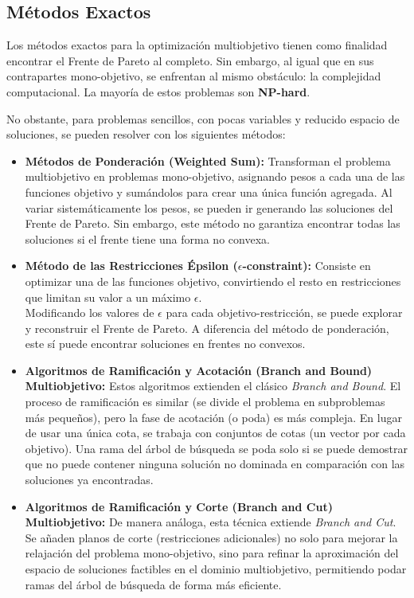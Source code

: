 \documentclass[12pt,a4paper]{book}
\begin{document}
\hrulefill

\subsection{Métodos Exactos}

Los métodos exactos para la optimización multiobjetivo tienen como finalidad encontrar el Frente de Pareto al completo. Sin embargo, al igual que en sus contrapartes mono-objetivo, se enfrentan al mismo obstáculo: la complejidad computacional. La mayoría de estos problemas son \textbf{NP-hard}.

No obstante, para problemas sencillos, con pocas variables y reducido espacio de soluciones, se pueden resolver con los siguientes métodos:

\begin{itemize}
    \item \textbf{Métodos de Ponderación (Weighted Sum):} Transforman el problema multiobjetivo en problemas mono-objetivo, asignando pesos a cada una de las funciones objetivo y sumándolos para crear una única función agregada. Al variar sistemáticamente los pesos, se pueden ir generando las soluciones del Frente de Pareto. Sin embargo, este método no garantiza encontrar todas las soluciones si el frente tiene una forma no convexa.

    \item \textbf{Método de las Restricciones Épsilon ($\epsilon$-constraint):} Consiste en optimizar una de las funciones objetivo, convirtiendo el resto en restricciones que limitan su valor a un máximo $\epsilon$.\\
    Modificando los valores de $\epsilon$ para cada objetivo-restricción, se puede explorar y reconstruir el Frente de Pareto. A diferencia del método de ponderación, este sí puede encontrar soluciones en frentes no convexos.

    \item \textbf{Algoritmos de Ramificación y Acotación (Branch and Bound) Multiobjetivo:} Estos algoritmos extienden el clásico \textit{Branch and Bound}. El proceso de ramificación es similar (se divide el problema en subproblemas más pequeños), pero la fase de acotación (o poda) es más compleja. En lugar de usar una única cota, se trabaja con conjuntos de cotas (un vector por cada objetivo). Una rama del árbol de búsqueda se poda solo si se puede demostrar que no puede contener ninguna solución no dominada en comparación con las soluciones ya encontradas.

    \item \textbf{Algoritmos de Ramificación y Corte (Branch and Cut) Multiobjetivo:} De manera análoga, esta técnica extiende \textit{Branch and Cut}. Se añaden planos de corte (restricciones adicionales) no solo para mejorar la relajación del problema mono-objetivo, sino para refinar la aproximación del espacio de soluciones factibles en el dominio multiobjetivo, permitiendo podar ramas del árbol de búsqueda de forma más eficiente.
\end{itemize}
\end{document}
